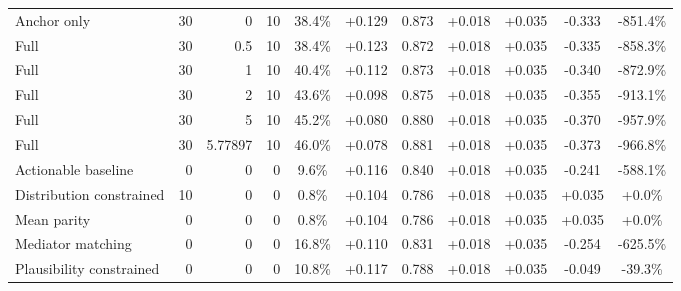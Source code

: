 \begin{table}[htbp]
\begin{tabular}{lrrrccccccc}
Anchor only & 30 & 0 & 10 & 38.4\% & +0.129 & 0.873 & +0.018 & +0.035 & -0.333 & -851.4\% \\
Full & 30 & 0.5 & 10 & 38.4\% & +0.123 & 0.872 & +0.018 & +0.035 & -0.335 & -858.3\% \\
Full & 30 & 1 & 10 & 40.4\% & +0.112 & 0.873 & +0.018 & +0.035 & -0.340 & -872.9\% \\
Full & 30 & 2 & 10 & 43.6\% & +0.098 & 0.875 & +0.018 & +0.035 & -0.355 & -913.1\% \\
Full & 30 & 5 & 10 & 45.2\% & +0.080 & 0.880 & +0.018 & +0.035 & -0.370 & -957.9\% \\
Full & 30 & 5.77897 & 10 & 46.0\% & +0.078 & 0.881 & +0.018 & +0.035 & -0.373 & -966.8\% \\
Actionable baseline & 0 & 0 & 0 & 9.6\% & +0.116 & 0.840 & +0.018 & +0.035 & -0.241 & -588.1\% \\
Distribution constrained & 10 & 0 & 0 & 0.8\% & +0.104 & 0.786 & +0.018 & +0.035 & +0.035 & +0.0\% \\
Mean parity & 0 & 0 & 0 & 0.8\% & +0.104 & 0.786 & +0.018 & +0.035 & +0.035 & +0.0\% \\
Mediator matching & 0 & 0 & 0 & 16.8\% & +0.110 & 0.831 & +0.018 & +0.035 & -0.254 & -625.5\% \\
Plausibility constrained & 0 & 0 & 0 & 10.8\% & +0.117 & 0.788 & +0.018 & +0.035 & -0.049 & -39.3\% \\
\bottomrule
\end{tabular}
\end{table}